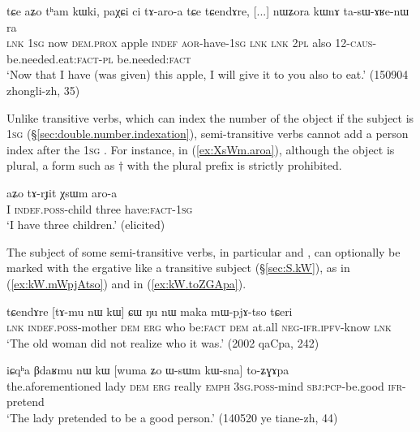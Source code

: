 \begin{exe}
\ex \label{ex:paXCi.ci.taroa}
\gll  tɕe aʑo tʰam kɯki, paχɕi ci tɤ-aro-a tɕe tɕendɤre, 
[...] nɯʑora kɯnɤ ta-sɯ-ɤʁe-nɯ ra \\
\textsc{lnk} \textsc{1sg} now \textsc{dem}.\textsc{prox} apple \textsc{indef} \textsc{aor}-have-\textsc{1sg} \textsc{lnk} \textsc{lnk} { } \textsc{2pl} also 1\fl{}2-\textsc{caus}-be.needed.eat:\textsc{fact}-\textsc{pl} be.needed:\textsc{fact} \\
\glt `Now that I have (was given) this apple, I will give it to you also to eat.' (150904 zhongli-zh, 35)
\end{exe}

Unlike transitive verbs, which can index the number of the object if the subject is \textsc{1sg} (§\ref{sec:double.number.indexation}), semi-transitive verbs cannot add a person index after the \textsc{1sg} . For instance, in (\ref{ex:XsWm.aroa}), although the object is plural, a form such as $\dagger$ with the  plural prefix is strictly prohibited. 

\begin{exe}
\ex   \label{ex:XsWm.aroa}
 \gll aʑo tɤ-rɟit χsɯm aro-a   \\
I \textsc{indef}.\textsc{poss}-child three have:\textsc{fact}-\textsc{1sg} \\
 \glt `I have three children.' (elicited)
\end{exe} 

The subject of some semi-transitive verbs, in particular  and , can optionally be marked with the ergative like a transitive subject (§\ref{sec:S.kW}), as  in (\ref{ex:kW.mWpjAtso}) and  in (\ref{ex:kW.toZGApa}). 

\begin{exe}
\ex   \label{ex:kW.mWpjAtso}
 \gll  tɕendɤre [tɤ-mu nɯ kɯ] ɕɯ ŋu nɯ maka mɯ-pjɤ-tso tɕeri \\
\textsc{lnk} \textsc{indef}.\textsc{poss}-mother \textsc{dem} \textsc{erg} who be:\textsc{fact} \textsc{dem} at.all \textsc{neg}-\textsc{ifr}.\textsc{ipfv}-know \textsc{lnk} \\
\glt `The old woman did not realize who it was.' (2002 qaCpa, 242)
\end{exe}

\begin{exe}
\ex   \label{ex:kW.toZGApa}
 \gll iɕqʰa βdaʁmu nɯ kɯ [wuma ʑo ɯ-sɯm kɯ-sna] to-ʑɣɤpa \\
 the.aforementioned lady \textsc{dem} \textsc{erg} really \textsc{emph} \textsc{3sg}.\textsc{poss}-mind \textsc{sbj}:\textsc{pcp}-be.good \textsc{ifr}-pretend \\
 \glt `The lady pretended to be a good person.' (140520 ye tiane-zh, 44)
\end{exe}



